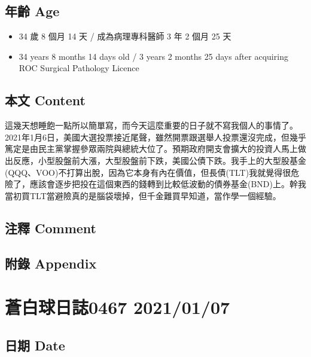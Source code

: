 \documentclass[
]{article}
\providecommand{\tightlist}{%
  \setlength{\itemsep}{0pt}\setlength{\parskip}{0pt}}
\begin{document}
\hypertarget{ux5e74ux9f61-age-5}{%
\subsection{年齡 Age}\label{ux5e74ux9f61-age-5}}

\begin{itemize}
\tightlist
\item
  34 歲 8 個月 14 天 / 成為病理專科醫師 3 年 2 個月 25 天
\item
  34 years 8 months 14 days old / 3 years 2 months 25 days after
  acquiring ROC Surgical Pathology Licence
\end{itemize}

\hypertarget{ux672cux6587-content-5}{%
\subsection{本文 Content}\label{ux672cux6587-content-5}}

這幾天想睡飽一點所以簡單寫，而今天這麼重要的日子就不寫我個人的事情了。2021年1月6日，美國大選投票接近尾聲，雖然開票跟選舉人投票還沒完成，但幾乎篤定是由民主黨掌握參眾兩院與總統大位了。預期政府開支會擴大的投資人馬上做出反應，小型股盤前大漲，大型股盤前下跌，美國公債下跌。我手上的大型股基金(QQQ、VOO)不打算出脫，因為它本身有內在價值，但長債(TLT)我就覺得很危險了，應該會逐步把投在這個東西的錢轉到比較低波動的債券基金(BND)上。幹我當初買TLT當避險真的是腦袋壞掉，但千金難買早知道，當作學一個經驗。

\hypertarget{ux6ce8ux91cb-comment-5}{%
\subsection{注釋 Comment}\label{ux6ce8ux91cb-comment-5}}

\hypertarget{ux9644ux9304-appendix-5}{%
\subsection{附錄 Appendix}\label{ux9644ux9304-appendix-5}}

\hypertarget{ux84bcux767dux7403ux65e5ux8a8c0467-20210107}{%
\section{蒼白球日誌0467
2021/01/07}\label{ux84bcux767dux7403ux65e5ux8a8c0467-20210107}}

\hypertarget{ux65e5ux671f-date-6}{%
\subsection{日期 Date}\label{ux65e5ux671f-date-6}}
\end{document}
